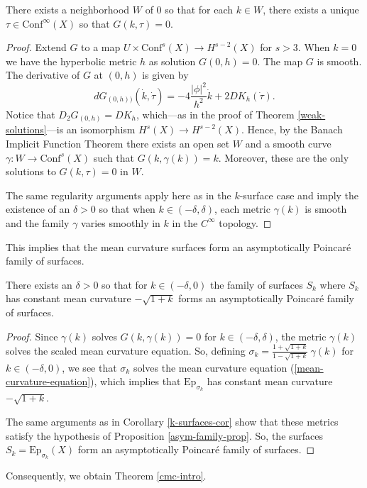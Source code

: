 \begin{thm}
There exists a neighborhood $W$ of 0 so that for each $k \in W$, there exists a unique $\tau \in \mathrm{Conf}^\infty(X)$ so that $G(k,\tau) = 0$.
\end{thm}

\begin{proof}
Extend $G$ to a map $U \times \mathrm{Conf}^s(X) \to H^{s-2}(X)$ for $s > 3$. 
When $k = 0$ we have the hyperbolic metric $h$ as solution $G(0,h) = 0$. 
The map $G$ is smooth. 
The derivative of $G$ at $(0,h)$ is given by 
\[
dG_{(0,h))}(\dot{k},\dot{\tau}) = -4 \frac{|\phi|^2}{h^2} \dot{k} + 2 D K_h(\dot{\tau}).
\]
Notice that $D_2 G_{(0,h)} = D K_h$, which---as in the proof of Theorem \ref{weak-solutions}---is an isomorphism $H^s(X) \to H^{s-2}(X)$.
Hence, by the Banach Implicit Function Theorem there exists an open set $W$ and a smooth curve $\gamma: W \to \mathrm{Conf}^{s}(X)$ such that $G(k,\gamma(k)) = k$. 
Moreover, these are the only solutions to $G(k,\tau) = 0$ in $W$.

The same regularity arguments apply here as in the $k$-surface case and imply the existence of an $\delta > 0$ so that when $k \in (-\delta,\delta)$, each metric $\gamma(k)$ is smooth and the family $\gamma$ varies smoothly in $k$ in the $C^\infty$ topology. 
\end{proof}


This implies that the mean curvature surfaces form an asymptotically Poincar\'e family of surfaces. 

\begin{cor}
There exists an $\delta > 0$ so that for $k \in (-\delta, 0)$ the family of surfaces $S_k$ where $S_k$ has constant mean curvature $-\sqrt{1+k}$ forms an asymptotically Poincar\'e family of surfaces. 
\end{cor}

\begin{proof}
Since $\gamma(k)$ solves $G(k,\gamma(k)) = 0$ for $k \in (-\delta,\delta)$, the metric $\gamma(k)$ solves the scaled mean curvature equation. 
So, defining $\sigma_k = \frac{1 + \sqrt{1+k}}{1 - \sqrt{1+k}} \ \gamma(k)$ for $k \in (-\delta,0)$, we see that $\sigma_k$ solves the mean curvature equation (\ref{mean-curvature-equation}), which implies that $\mathrm{Ep}_{\sigma_k}$ has constant mean curvature $-\sqrt{1+k}$.

The same arguments as in Corollary \ref{k-surfaces-cor} show that these metrics satisfy the hypothesis of Proposition \ref{asym-family-prop}.
So, the surfaces $S_k = \mathrm{Ep}_{\sigma_{k}}(X)$ form an asymptotically Poincar\'e family of surfaces. 
\end{proof}

Consequently, we obtain Theorem \ref{cmc-intro}.